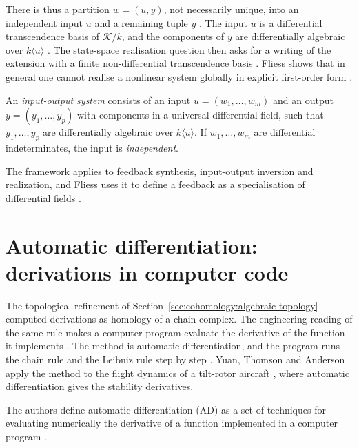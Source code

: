 There is thus a partition $w=(u,y)$, not necessarily unique, into an
independent input $u$ and a remaining tuple $y$
\cite[\S1.2, p.~228]{Fliess1989}. The input $u$ is a
differential transcendence basis of $\mathcal{K}/k$, and the components of
$y$ are differentially algebraic over $k\langle u\rangle$
\cite[\S1.2, p.~228]{Fliess1989}. The state-space realisation question then
asks for a writing of the extension with a finite non-differential
transcendence basis \cite[\S1.2, p.~228]{Fliess1989}. Fliess shows that in general one cannot realise a
nonlinear system globally in explicit first-order form
\cite[Introduction, p.~227]{Fliess1989}.

\begin{definition}\label{def:diffalg:io-system}
An \emph{input-output system} consists of an input $u=(w_1,\ldots,w_m)$ and an
output $y=(y_1,\ldots,y_p)$ with components in a universal differential field,
such that $y_1,\ldots,y_p$ are differentially algebraic over $k\langle u\rangle$.
If $w_1,\ldots,w_m$ are differential indeterminates, the input is
\emph{independent}.
\end{definition}

The framework applies to feedback synthesis, input-output inversion and
realization, and Fliess uses it to define a feedback as a specialisation of
differential fields \cite[Introduction, p.~227]{Fliess1989}.

\section{Automatic differentiation: derivations in computer code}\label{sec:differential-algebra:automatic-differentiation}

The topological refinement of Section~\ref{sec:cohomology:algebraic-topology}
computed derivations as homology of a chain complex. The engineering reading
of the same rule makes a computer program evaluate the derivative of the
function it implements \cite[Introduction, p.~2]{YuanThomsonAnderson2020}.
The method is automatic differentiation, and the program runs the chain rule
and the Leibniz rule step by step \cite{YuanThomsonAnderson2020}.
Yuan, Thomson and Anderson apply the method to the flight dynamics of a
tilt-rotor aircraft \cite{YuanThomsonAnderson2020}, where automatic
differentiation gives the stability derivatives.

The authors define automatic differentiation (AD) as a set of techniques for
evaluating numerically the derivative of a function implemented in a computer
program \cite[Introduction, p.~2]{YuanThomsonAnderson2020}.


